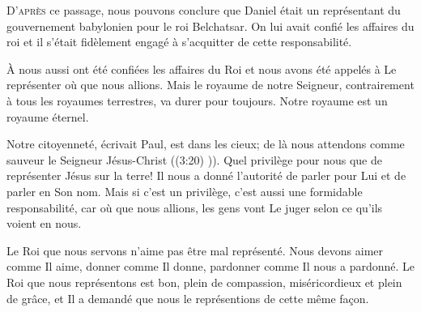 \dvrule







\lettrine{D}{'après} ce passage,
 nous pouvons conclure que Daniel était un représentant du gouvernement
 babylonien pour le roi Belchatsar. On lui avait confié
 les affaires du roi et il s'était fidèlement engagé
 à s'acquitter de cette responsabilité. 

À nous aussi ont été confiées les affaires du Roi et nous avons été appelés
 à Le représenter où que nous allions. Mais le royaume de notre Seigneur,
 contrairement à tous les royaumes terrestres, 
 va durer pour toujours.  Notre royaume est un royaume éternel. 


\Og Notre citoyenneté, écrivait Paul, 
 est dans les cieux; de là nous attendons comme sauveur
 le Seigneur Jésus-Christ \Fg{} ((3:20) \NBS)).
 Quel privilège pour nous que de représenter Jésus sur la terre!
 Il nous a donné l'autorité de parler pour Lui et de parler en Son nom.
 Mais si c'est un privilège, c'est aussi une formidable responsabilité,
 car où que nous allions, les gens vont Le juger selon ce qu'ils voient en nous. 

Le Roi que nous servons n'aime pas être mal représenté.
 Nous devons aimer comme Il aime, donner comme Il donne, pardonner
 comme Il nous a pardonné. Le Roi que nous représentons est bon,
 plein de compassion, miséricordieux et plein de grâce,
 et Il a demandé que nous le représentions de cette même fa\c{c}on. 

